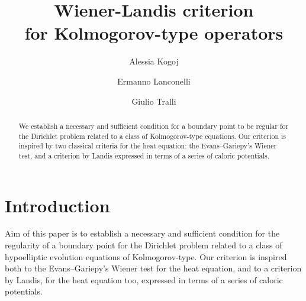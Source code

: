 \documentclass[10pt]{amsart}
\numberwithin{equation}{section}
\begin{document}
\title[Wiener-Landis criterion for Kolmogorov-type operators]{Wiener-Landis criterion \\ for Kolmogorov-type operators}


 
\author[A.E. Kogoj]{Alessia Kogoj}
\address{Dipartimento di Scienze Pure e Applicate (DiSPeA), 
				 Universit\`{a} degli Studi di Urbino ``Carlo Bo'', 
				 Piazza della Repubblica, 13 - 61029 Urbino (PU), Italy.
         }
\author[E. Lanconelli]{Ermanno Lanconelli}
\address{Dipartimento di Matematica,
         Universit\`{a} degli Studi di Bologna,
         Piazza di Porta S. Donato, 5 - 40126 Bologna, Italy.
         }
\author[G. Tralli]{Giulio Tralli}
\address{Dipartimento di Matematica,
         Universit\`{a} degli Studi di Bologna,
         Piazza di Porta S. Donato, 5 - 40126 Bologna, Italy.
         }







\date{}


\begin{abstract} We establish a necessary and sufficient condition for a boundary point to be regular for the Dirichlet problem related to a class of Kolmogorov-type equations. Our criterion is inspired by two classical criteria for the heat equation: the Evans--Gariepy's Wiener test, and a criterion by Landis expressed in terms of a series of caloric potentials.
\end{abstract}
\maketitle


\section{Introduction}\label{intro}
Aim of this paper is to establish a necessary and sufficient condition for the regularity of a boundary point for the Dirichlet problem related to a class of hypoelliptic evolution equations of Kolmogorov-type. Our criterion is inspired both to the Evans--Gariepy's Wiener test for the heat equation, and to a criterion by Landis, for the heat equation too, expressed in terms of a series of caloric potentials. 
\end{document}
